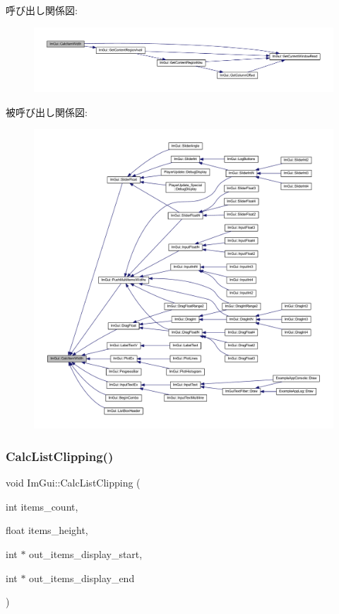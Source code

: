 呼び出し関係図\+:\nopagebreak
\begin{figure}[H]
\begin{center}
\leavevmode
\includegraphics[width=350pt]{namespace_im_gui_ab3b3ba92ebd8bca4a552dd93321a1994_cgraph}
\end{center}
\end{figure}
被呼び出し関係図\+:\nopagebreak
\begin{figure}[H]
\begin{center}
\leavevmode
\includegraphics[width=350pt]{namespace_im_gui_ab3b3ba92ebd8bca4a552dd93321a1994_icgraph}
\end{center}
\end{figure}
\mbox{\label{namespace_im_gui_ae5319370628374ef8febf0c25c285b7e}} 
\subsubsection{\texorpdfstring{Calc\+List\+Clipping()}{CalcListClipping()}}
{\footnotesize\ttfamily void Im\+Gui\+::\+Calc\+List\+Clipping (\begin{DoxyParamCaption}\item[{int}]{items\+\_\+count,  }\item[{float}]{items\+\_\+height,  }\item[{int $\ast$}]{out\+\_\+items\+\_\+display\+\_\+start,  }\item[{int $\ast$}]{out\+\_\+items\+\_\+display\+\_\+end }\end{DoxyParamCaption})}




